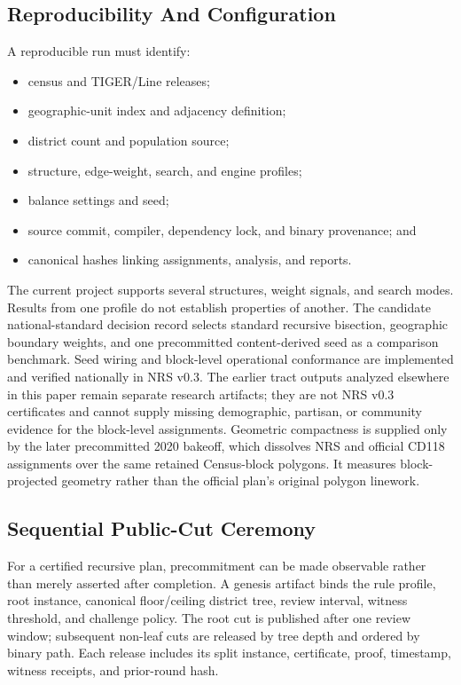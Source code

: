 \subsection{Reproducibility And Configuration}

A reproducible run must identify:

\begin{itemize}
\item census and TIGER/Line releases;
\item geographic-unit index and adjacency definition;
\item district count and population source;
\item structure, edge-weight, search, and engine profiles;
\item balance settings and seed;
\item source commit, compiler, dependency lock, and binary provenance; and
\item canonical hashes linking assignments, analysis, and reports.
\end{itemize}

The current project supports several structures, weight signals, and search
modes. Results from one profile do not establish properties of another. The
candidate national-standard decision record selects standard recursive
bisection, geographic boundary weights, and one precommitted content-derived
seed as a comparison benchmark. Seed wiring and block-level operational
conformance are implemented and verified nationally in NRS v0.3. The earlier
tract outputs analyzed elsewhere in this paper remain separate research
artifacts; they are not NRS v0.3 certificates and cannot supply missing
demographic, partisan, or community evidence for the block-level assignments.
Geometric compactness is supplied only by the later precommitted 2020 bakeoff,
which dissolves NRS and official CD118 assignments over the same retained
Census-block polygons. It measures block-projected geometry rather than the
official plan's original polygon linework.

\subsection{Sequential Public-Cut Ceremony}

For a certified recursive plan, precommitment can be made observable rather
than merely asserted after completion. A genesis artifact binds the rule
profile, root instance, canonical floor/ceiling district tree, review interval,
witness threshold, and challenge policy. The root cut is published after one
review window; subsequent non-leaf cuts are released by tree depth and ordered
by binary path. Each release includes its split instance, certificate, proof,
timestamp, witness receipts, and prior-round hash.

